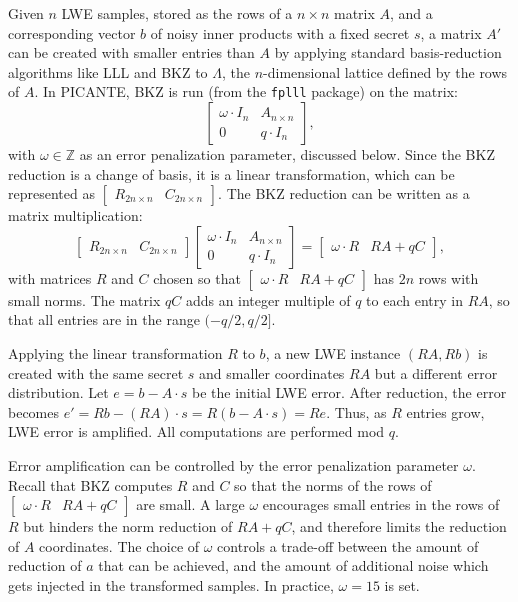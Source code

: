 \documentclass{article}
\begin{document}
Given \( n \) LWE samples, stored as the rows of a \( n \times n \) matrix \( A \), and a corresponding vector \( b \) of noisy inner products with a fixed secret \( s \), a matrix \( A' \) can be created with smaller entries than \( A \) by applying standard basis-reduction algorithms like LLL and BKZ to \( \Lambda \), the \( n \)-dimensional lattice defined by the rows of \( A \). In PICANTE, BKZ is run (from the \texttt{fplll} package) on the matrix:
\[
\begin{bmatrix}
\omega \cdot I_n & A_{n \times n} \\
0 & q \cdot I_n
\end{bmatrix},
\]
with \( \omega \in \mathbb{Z} \) as an error penalization parameter, discussed below. Since the BKZ reduction is a change of basis, it is a linear transformation, which can be represented as \( \begin{bmatrix} R_{2n \times n} & C_{2n \times n} \end{bmatrix} \). The BKZ reduction can be written as a matrix multiplication:
\[
\begin{bmatrix} R_{2n \times n} & C_{2n \times n} \end{bmatrix}
\begin{bmatrix}
\omega \cdot I_n & A_{n \times n} \\
0 & q \cdot I_n
\end{bmatrix}
= \begin{bmatrix}
\omega \cdot R & R A + q C
\end{bmatrix},
\]
with matrices \( R \) and \( C \) chosen so that \( \begin{bmatrix} \omega \cdot R & R A + q C \end{bmatrix} \) has \( 2n \) rows with small norms. The matrix \( q C \) adds an integer multiple of \( q \) to each entry in \( R A \), so that all entries are in the range \( (-q/2, q/2] \).

Applying the linear transformation \( R \) to \( b \), a new LWE instance \( (R A, R b) \) is created with the same secret \( s \) and smaller coordinates \( R A \) but a different error distribution. Let \( e = b - A \cdot s \) be the initial LWE error. After reduction, the error becomes \( e' = R b - (R A) \cdot s = R (b - A \cdot s) = R e \). Thus, as \( R \) entries grow, LWE error is amplified. All computations are performed mod \( q \).

Error amplification can be controlled by the error penalization parameter \( \omega \). Recall that BKZ computes \( R \) and \( C \) so that the norms of the rows of \( \begin{bmatrix} \omega \cdot R & R A + q C \end{bmatrix} \) are small. A large \( \omega \) encourages small entries in the rows of \( R \) but hinders the norm reduction of \( R A + q C \), and therefore limits the reduction of \( A \) coordinates. The choice of \( \omega \) controls a trade-off between the amount of reduction of \( a \) that can be achieved, and the amount of additional noise which gets injected in the transformed samples. In practice, \( \omega = 15 \) is set.
\end{document}
